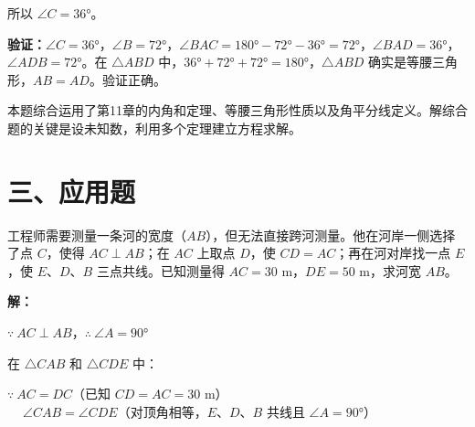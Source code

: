 \documentclass[12pt, a4paper]{ctexart}
\begin{document}
所以 $\angle C = 36°$。

\textbf{验证：}$\angle C = 36°$，$\angle B = 72°$，$\angle BAC = 180° - 72° - 36° = 72°$，$\angle BAD = 36°$，$\angle ADB = 72°$。在 $\triangle ABD$ 中，$36° + 72° + 72° = 180°$，$\triangle ABD$ 确实是等腰三角形，$AB = AD$。验证正确。

\begin{tipbox}[方法总结]
本题综合运用了第11章的内角和定理、等腰三角形性质以及角平分线定义。解综合题的关键是设未知数，利用多个定理建立方程求解。
\end{tipbox}

\section*{\textcolor{apppurple}{三、应用题}}

\begin{appbox}[【应用1】工程测量中的全等三角形]
工程师需要测量一条河的宽度（$AB$），但无法直接跨河测量。他在河岸一侧选择了点 $C$，使得 $AC \perp AB$；在 $AC$ 上取点 $D$，使 $CD = AC$；再在河对岸找一点 $E$，使 $E$、$D$、$B$ 三点共线。已知测量得 $AC = 30\text{ m}$，$DE = 50\text{ m}$，求河宽 $AB$。

\begin{center}
\end{center}
\end{appbox}

\textbf{解：}

$\because\ AC \perp AB$，$\therefore\ \angle A = 90°$

在 $\triangle CAB$ 和 $\triangle CDE$ 中：

$\because\ AC = DC$（已知 $CD = AC = 30\text{ m}$）\\
$\quad\ \angle CAB = \angle CDE$（对顶角相等，$E$、$D$、$B$ 共线且 $\angle A = 90°$）
\end{document}
